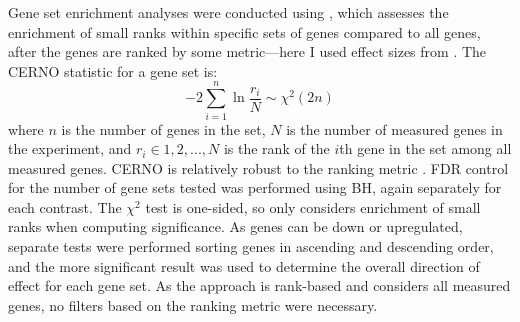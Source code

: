 Gene set enrichment analyses were conducted using  \autocite{weiner3rd2016TmodPackageGeneral}, 
which assesses the enrichment of small ranks within specific sets of genes compared to all genes, after the genes are ranked by some metric---here I used effect sizes from .
%
%
The CERNO statistic for a gene set is:
\begin{equation}
    -2 \sum_{i=1}^{n} \ln \frac{r_i}{N} \sim \chi^2(2n)
\end{equation}
where $n$ is the number of genes in the set,
$N$ is the number of measured genes in the experiment,
and $r_i \in 1, 2, ..., N$ is the rank of the $i$th gene in the set among all measured genes.
CERNO is relatively robust to the ranking metric \autocite{zyla2019GeneSetEnrichment}.
\gls{FDR} control for the number of gene sets tested was performed using \gls{BH}, again separately for each contrast.
The $\chi^2$ test is one-sided, so  only considers enrichment of small ranks when computing significance.
As genes can be down or upregulated, 
separate tests were performed sorting genes in ascending and descending order,
and the more significant result was used to determine the overall direction of effect for each gene set.
As the approach is rank-based and considers all measured genes, no filters based on the ranking metric were necessary.

